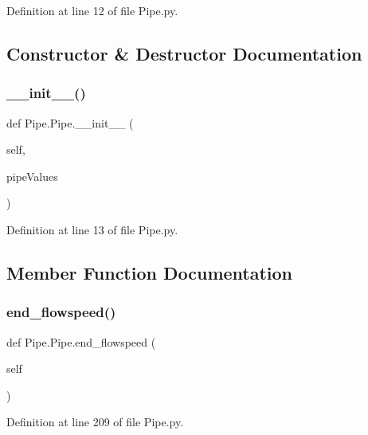 Definition at line 12 of file Pipe.\+py.



\subsection{Constructor \& Destructor Documentation}
\mbox{\label{class_pipe_1_1_pipe_af59d40a027d25c62e41d11a08f14729f}} 
\subsubsection{\texorpdfstring{\+\_\+\+\_\+init\+\_\+\+\_\+()}{\_\_init\_\_()}}
{\footnotesize\ttfamily def Pipe.\+Pipe.\+\_\+\+\_\+init\+\_\+\+\_\+ (\begin{DoxyParamCaption}\item[{}]{self,  }\item[{}]{pipe\+Values }\end{DoxyParamCaption})}



Definition at line 13 of file Pipe.\+py.



\subsection{Member Function Documentation}
\mbox{\label{class_pipe_1_1_pipe_abab09825864d4997d16ffc1dcdbfcf97}} 
\subsubsection{\texorpdfstring{end\+\_\+flowspeed()}{end\_flowspeed()}}
{\footnotesize\ttfamily def Pipe.\+Pipe.\+end\+\_\+flowspeed (\begin{DoxyParamCaption}\item[{}]{self }\end{DoxyParamCaption})}



Definition at line 209 of file Pipe.\+py.

\mbox{\label{class_pipe_1_1_pipe_a93aa9c0dd790f2014d2c403b23164646}} 
